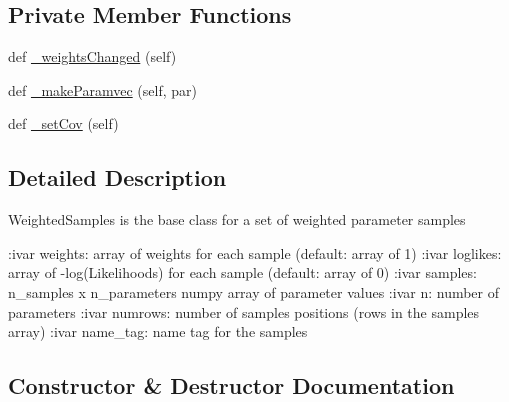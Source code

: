 \subsection*{Private Member Functions}
\begin{DoxyCompactItemize}
\item 
def \mbox{\hyperlink{classgetdist_1_1chains_1_1WeightedSamples_a703edf346f9300d9251c0f7be93d6276}{\+\_\+weights\+Changed}} (self)
\item 
def \mbox{\hyperlink{classgetdist_1_1chains_1_1WeightedSamples_a97daf2e7045ad90ef4ff8030b9d65740}{\+\_\+make\+Paramvec}} (self, par)
\item 
def \mbox{\hyperlink{classgetdist_1_1chains_1_1WeightedSamples_a50c43f2b7f5f0ccd480d227a950a52f1}{\+\_\+set\+Cov}} (self)
\end{DoxyCompactItemize}


\subsection{Detailed Description}
\begin{DoxyVerb}WeightedSamples is the base class for a set of weighted parameter samples

:ivar weights:  array of weights for each sample (default: array of 1)
:ivar loglikes: array of -log(Likelihoods) for each sample (default: array of 0)
:ivar samples: n_samples x n_parameters numpy array of parameter values
:ivar n: number of parameters
:ivar numrows: number of samples positions (rows in the samples array)
:ivar name_tag: name tag for the samples
\end{DoxyVerb}
 

\subsection{Constructor \& Destructor Documentation}
\mbox{\label{classgetdist_1_1chains_1_1WeightedSamples_a418f3fb30b5d7a6815c1d455dc3c502c}} 
